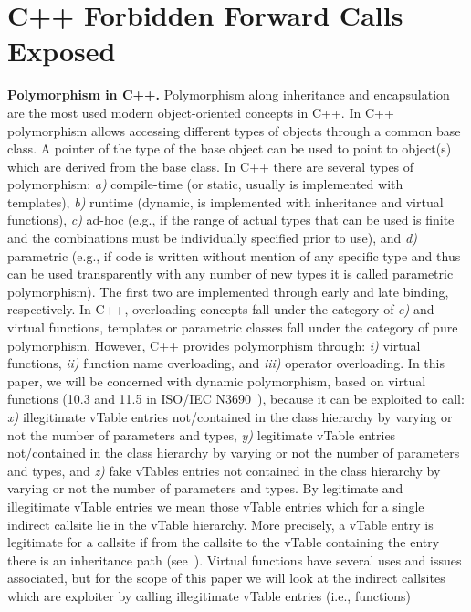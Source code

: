 \section{C++ Forbidden Forward Calls Exposed}
\label{C++ Bad Forward Indirect Calls}
\textbf{Polymorphism in C++.}
\label{Polymorphism in C++}
Polymorphism along inheritance and encapsulation
are the most used modern object-oriented concepts in C++. 
In C++ polymorphism allows accessing different types of objects 
through a common base class. A pointer of the type of the base object
can be used to point to object(s) which are derived from the base class.
In C++ there are several types of polymorphism:
\textit{a)} compile-time (or static, usually is implemented with templates), 
\textit{b)} runtime (dynamic, is implemented with inheritance and virtual functions), 
\textit{c)} ad-hoc (e.g., if the range of actual types that can be used is finite and the combinations must be individually specified prior to use), and
\textit{d)} parametric (e.g., if code is written without mention of any specific type and thus can be used transparently with any number of new types it is called parametric polymorphism). 
The first two are implemented through early 
and late binding, respectively.
In C++, overloading concepts fall under the category of \textit{c)} and virtual functions, templates or parametric classes fall under the category of pure polymorphism.
However, C++ provides polymorphism through: 
\textit{i)} virtual functions,
\textit{ii)} function name overloading, and 
\textit{iii)} operator overloading. 
In this paper, we will be concerned with dynamic polymorphism, based on virtual functions (10.3 and 11.5 in ISO/IEC N3690~\cite{iso:iecN3690}), because it can be exploited to call: 
\textit{x)} illegitimate vTable entries not/contained in the class hierarchy by varying or not the number of parameters and types,
\textit{y)} legitimate vTable entries not/contained in the class hierarchy by varying or not the number of parameters and types, and 
\textit{z)} fake vTables entries not contained in the class hierarchy by varying or not the number of parameters and types.
By legitimate and illegitimate vTable entries we mean those 
vTable entries which for a single indirect callsite lie in the 
vTable hierarchy. More precisely, a vTable entry is legitimate for 
a callsite if from the callsite to the vTable containing the entry there
is an inheritance path (see~\cite{haller:shrinkwrap}).
Virtual functions have several uses and issues associated, 
but for the scope of this paper we will look at the indirect 
callsites which are exploiter by calling illegitimate vTable entries (i.e., functions)

